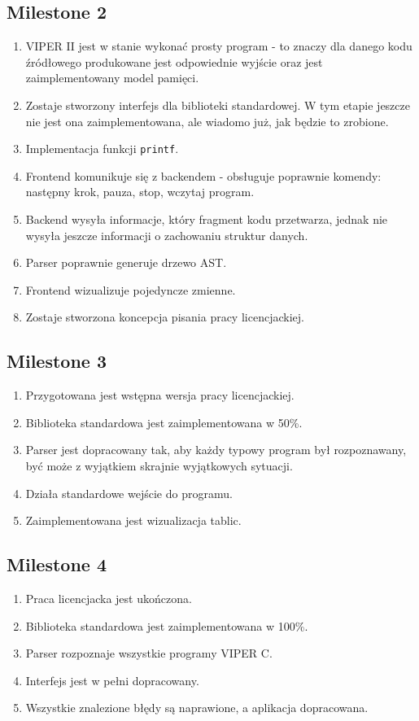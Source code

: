 \documentclass[a4paper,twoside,openright,11pt]{report}
\begin{document}
  \subsection {Milestone 2}
  \begin {enumerate}
    \item VIPER II jest w stanie wykonać prosty program - to znaczy dla danego kodu źródłowego produkowane jest odpowiednie wyjście oraz jest zaimplementowany model pamięci.
    \item Zostaje stworzony interfejs dla biblioteki standardowej. W tym etapie jeszcze nie jest ona zaimplementowana, ale wiadomo już, jak będzie to zrobione. 
    \item Implementacja funkcji \texttt{printf}.
    \item Frontend komunikuje się z backendem - obsługuje poprawnie komendy: następny krok, pauza, stop, wczytaj program. 
    \item Backend wysyła informacje, który fragment kodu przetwarza, jednak nie wysyła jeszcze informacji o zachowaniu struktur danych.
    \item Parser poprawnie generuje drzewo AST.
    \item Frontend wizualizuje pojedyncze zmienne.
    \item Zostaje stworzona koncepcja pisania pracy licencjackiej.
  \end {enumerate}
  \subsection {Milestone 3}
  \begin {enumerate}
    \item Przygotowana jest wstępna wersja pracy licencjackiej.
    \item Biblioteka standardowa jest zaimplementowana w 50\%. 
    \item Parser jest dopracowany tak, aby każdy typowy program był rozpoznawany, być może z wyjątkiem skrajnie wyjątkowych sytuacji.
    \item Działa standardowe wejście do programu.
    \item Zaimplementowana jest wizualizacja tablic.
  \end {enumerate}
  \subsection {Milestone 4}
  \begin {enumerate}
    \item Praca licencjacka jest ukończona.
    \item Biblioteka standardowa jest zaimplementowana w 100\%.
    \item Parser rozpoznaje wszystkie programy VIPER C.
    \item Interfejs jest w pełni dopracowany.
    \item Wszystkie znalezione błędy są naprawione, a aplikacja dopracowana.
  \end {enumerate}
\end{document}
